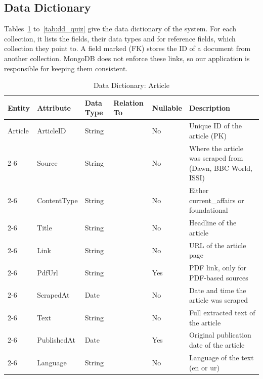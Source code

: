 \documentclass{FastFyp}
\begin{document}
\subsection{Data Dictionary}
Tables~\ref{tab:dd_article} to~\ref{tab:dd_quiz} give the data dictionary of the system. For each collection, it lists the fields, their data types and for reference fields, which collection they point to. A field marked (FK) stores the ID of a document from another collection. MongoDB does not enforce these links, so our application is responsible for keeping them consistent.
\begingroup
\renewcommand{\baselinestretch}{1}\selectfont
\begin{table}[H]
\centering
\small
\setlength{\tabcolsep}{4pt}
\caption{Data Dictionary: Article}\label{tab:dd_article}
\begin{tabular}{|p{2.0cm}|p{2.5cm}|p{1.7cm}|p{1.9cm}|p{1.3cm}|p{4.6cm}|}
\hline
\textbf{Entity} & \textbf{Attribute} & \textbf{Data Type} & \textbf{Relation To} & \textbf{Nullable} & \textbf{Description} \\ \hline
Article & ArticleID & String & & No & Unique ID of the article (PK) \\ \cline{2-6}
 & Source & String & & No & Where the article was scraped from (Dawn, BBC World, ISSI) \\ \cline{2-6}
 & ContentType & String & & No & Either current\_affairs or foundational \\ \cline{2-6}
 & Title & String & & No & Headline of the article \\ \cline{2-6}
 & Link & String & & No & URL of the article page \\ \cline{2-6}
 & PdfUrl & String & & Yes & PDF link, only for PDF-based sources\\ \cline{2-6}
 & ScrapedAt & Date & & No & Date and time the article was scraped \\ \cline{2-6}
 & Text & String & & No & Full extracted text of the article \\ \cline{2-6}
 & PublishedAt & Date & & Yes & Original publication date of the article \\ \cline{2-6}
 & Language & String & & No & Language of the text (en or ur) \\ \hline
\end{tabular}
\end{table}
\end{document}
